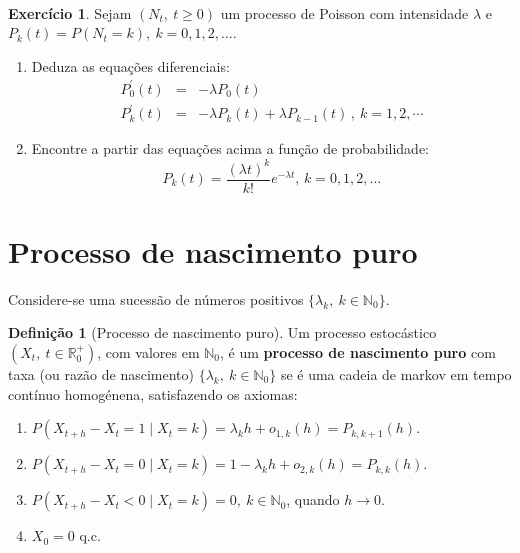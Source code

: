 \documentclass[
  11pt,
  a4paper,
]{book}
\theoremstyle{definition}
\newtheorem{definition}{Definição}[chapter]
\theoremstyle{definition}
\theoremstyle{definition}
\newtheorem{exercise}{Exercício}[chapter]
\theoremstyle{definition}
\theoremstyle{remark}
\begin{document}
\(\,\)

\begin{exercise}
\leavevmode

Sejam \((N_t, ~t\geq 0)\) um processo de Poisson com intensidade \(\lambda\) e \(P_{k}(t)=P(N_t=k), ~k=0,1,2,\dots\).

\begin{enumerate}
\def\labelenumi{(\alph{enumi})}
\item
  Deduza as equações diferenciais:
  \begin{eqnarray*}
  P_{0}^{\prime }(t) &=&-\lambda P_{0}(t) \\
  P_{k}^{\prime }(t) &=&-\lambda P_{k}(t)+\lambda P_{k-1}(t)\, ,%
  ~ k=1,2,\cdots
  \end{eqnarray*}
\item
  Encontre a partir das equações acima a função de
  probabilidade:
  \[
  P_{k}(t)=\frac{(\lambda t)^{k}}{k!}e^{-\lambda t} , \,k=0,1,2,\dots
  \]
\end{enumerate}

\end{exercise}

\section{Processo de nascimento puro}\label{processo-de-nascimento-puro}

Considere-se uma sucessão de números positivos \(\{\lambda_k, ~k \in \mathbb{N}_0\}\).

\begin{definition}[Processo de nascimento puro]

Um processo estocástico \((X_t, ~ t \in \mathbb{R}_0^+)\), com valores em \(\mathbb{N}_0\), é um \textbf{processo de nascimento puro} com taxa (ou razão de nascimento) \(\{\lambda_k, ~k \in \mathbb{N}_0\}\) se é uma cadeia de markov em tempo contínuo homogénena, satisfazendo os axiomas:

\begin{enumerate}
\def\labelenumi{(\roman{enumi})}
\item
  \(P(X_{t+h}-X_t=1 \mid X_{t}=k)=\lambda_k h + o_{1,k}(h)=P_{k,k+1}(h)\).
\item
  \(P(X_{t+h}-X_t=0 \mid X_{t}=k)=1-\lambda_k h + o_{2,k}(h)=P_{k,k}(h)\).
\item
  \(P(X_{t+h}-X_t < 0 \mid X_{t}=k)=0, ~ k \in \mathbb{N}_0\), quando \(h \to 0\).
\item
  \(X_0=0\) q.c.
\end{enumerate}

\end{definition}
\end{document}
